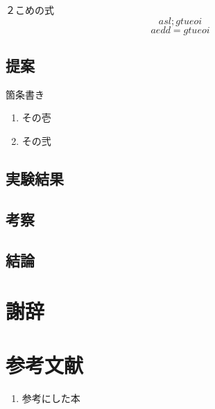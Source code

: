 \documentclass[11pt, a4paper]{jsarticle}
\numberwithin{equation}{section}
\begin{document}
２こめの式
\begin{equation}
asl;gtueoi
\end{equation}
\begin{equation}
aedd=gtueoi
\end{equation}
	
\subsection{提案}
箇条書き
\begin{enumerate}
	\item その壱
	\item その弐
\end{enumerate}

\subsection{実験結果}
\subsection{考察}
\subsection{結論}
\section*{謝辞}
\section*{参考文献}

\renewcommand{\labelenumi}{[\arabic{enumi}]}
\begin{enumerate}
	\item 参考にした本
\end{enumerate}
\end{document}
